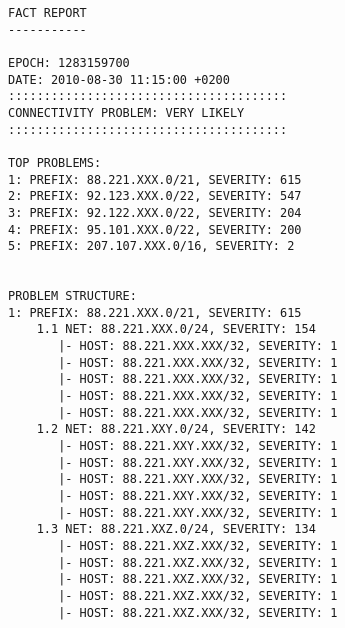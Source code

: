 \begin{lstlisting}[caption=an excerpt of a report showing the presentation of the problem in tree structure]
FACT REPORT
-----------

EPOCH: 1283159700
DATE: 2010-08-30 11:15:00 +0200
:::::::::::::::::::::::::::::::::::::::
CONNECTIVITY PROBLEM: VERY LIKELY
:::::::::::::::::::::::::::::::::::::::

TOP PROBLEMS:
1: PREFIX: 88.221.XXX.0/21, SEVERITY: 615
2: PREFIX: 92.123.XXX.0/22, SEVERITY: 547
3: PREFIX: 92.122.XXX.0/22, SEVERITY: 204
4: PREFIX: 95.101.XXX.0/22, SEVERITY: 200
5: PREFIX: 207.107.XXX.0/16, SEVERITY: 2


PROBLEM STRUCTURE:
1: PREFIX: 88.221.XXX.0/21, SEVERITY: 615
    1.1 NET: 88.221.XXX.0/24, SEVERITY: 154
       |- HOST: 88.221.XXX.XXX/32, SEVERITY: 1
       |- HOST: 88.221.XXX.XXX/32, SEVERITY: 1
       |- HOST: 88.221.XXX.XXX/32, SEVERITY: 1
       |- HOST: 88.221.XXX.XXX/32, SEVERITY: 1
       |- HOST: 88.221.XXX.XXX/32, SEVERITY: 1
    1.2 NET: 88.221.XXY.0/24, SEVERITY: 142
       |- HOST: 88.221.XXY.XXX/32, SEVERITY: 1
       |- HOST: 88.221.XXY.XXX/32, SEVERITY: 1
       |- HOST: 88.221.XXY.XXX/32, SEVERITY: 1
       |- HOST: 88.221.XXY.XXX/32, SEVERITY: 1
       |- HOST: 88.221.XXY.XXX/32, SEVERITY: 1
    1.3 NET: 88.221.XXZ.0/24, SEVERITY: 134
       |- HOST: 88.221.XXZ.XXX/32, SEVERITY: 1
       |- HOST: 88.221.XXZ.XXX/32, SEVERITY: 1
       |- HOST: 88.221.XXZ.XXX/32, SEVERITY: 1
       |- HOST: 88.221.XXZ.XXX/32, SEVERITY: 1
       |- HOST: 88.221.XXZ.XXX/32, SEVERITY: 1
\end{lstlisting}